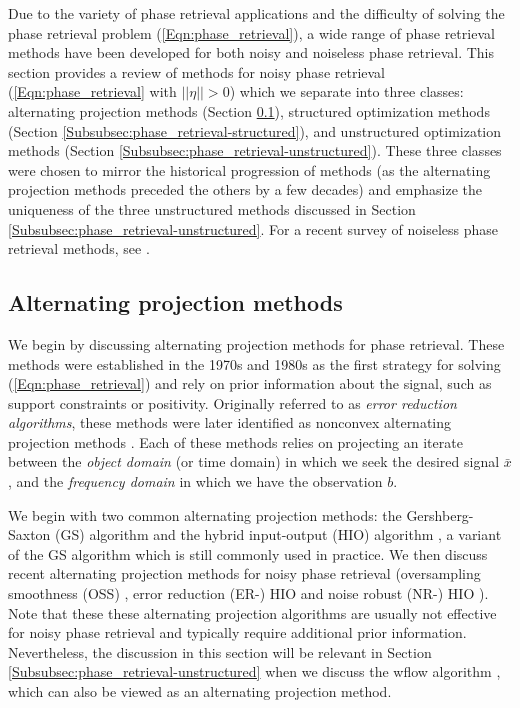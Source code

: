 Due to the variety of phase retrieval applications and the difficulty of solving the phase retrieval problem (\ref{Eqn:phase_retrieval}), a wide range of phase retrieval methods have been developed for both noisy and noiseless phase retrieval.  This section provides a review of methods for noisy phase retrieval (\ref{Eqn:phase_retrieval} with $||\eta|| > 0$) which we separate into three classes: alternating projection methods (Section \ref{Subsubsec:phase_retrieval-alternating_direction_methods}), structured optimization methods (Section \ref{Subsubsec:phase_retrieval-structured}), and unstructured optimization methods (Section \ref{Subsubsec:phase_retrieval-unstructured}).  These three classes were chosen to mirror the historical progression of methods (as the alternating projection methods preceded the others by a few decades) and emphasize the uniqueness of the three unstructured methods discussed in Section \ref{Subsubsec:phase_retrieval-unstructured}.  For a recent survey of noiseless phase retrieval methods, see \cite{DBLP:journals/corr/JaganathanEH15a}.








\subsection{Alternating projection methods}		\label{Subsubsec:phase_retrieval-alternating_direction_methods}



We begin by discussing alternating projection methods for phase retrieval.  These methods were established in the 1970s and 1980s as the first strategy for solving (\ref{Eqn:phase_retrieval}) and rely on prior information about the signal, such as support constraints or positivity.  Originally referred to as \textit{error reduction algorithms}, these methods were later identified as nonconvex alternating projection methods \cite{LeviS84}.  Each of these methods relies on projecting an iterate between the \textit{object domain} (or time domain) in which we seek the desired signal $\bar{x}$, and the \textit{frequency domain} in which we have the observation $b$.  

We begin with two common alternating projection methods: the Gershberg-Saxton (GS) algorithm \cite{GS72} and the hybrid input-output (HIO) algorithm \cite{Fienup82}, a variant of the GS algorithm which is still commonly used in practice.  
We then discuss recent alternating projection methods for noisy phase retrieval (oversampling smoothness (OSS) \cite{rodriguez2013oversampling}, error reduction (ER-) HIO and noise robust (NR-) HIO \cite{martin2012noise}).
Note that these these alternating projection algorithms are usually not effective for noisy phase retrieval and typically require additional prior information.
Nevertheless, the discussion in this section will be relevant in Section \ref{Subsubsec:phase_retrieval-unstructured} when we discuss the wflow algorithm \cite{DBLP:journals/tit/CandesLS15}, which can also be viewed as an alternating projection method.  






